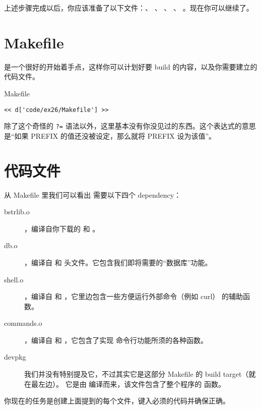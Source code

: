 上述步骤完成以后，你应该准备了以下文件：、 、
、 、 。现在你可以继续了。

\section{Makefile}

 是一个很好的开始着手点，这样你可以计划好要 build 的内容，以及你需要建立的
代码文件。

\begin{code}{Makefile}
\begin{lstlisting}
<< d['code/ex26/Makefile'] >>
\end{lstlisting}
\end{code}

除了这个奇怪的 \verb|?=| 语法以外，这里基本没有你没见过的东西。这个表达式的意思是“如果 PREFIX 
的值还没被设定，那么就将 PREFIX 设为该值”。

\section{代码文件}

从 Makefile 里我们可以看出  需要以下四个 dependency：

\begin{description}
\item[bstrlib.o]，编译自你下载的  和 。
\item[db.o]，编译自  和  头文件。它包含我们即将需要的“数据库”功能。
\item[shell.o]，编译自  和 ，它里边包含一些方便运行外部命令（例如 curl）
    的辅助函数。
\item[commands.o]，编译自  和 ，它包含了实现  
    命令行功能所须的各种函数。
\item[devpkg] 我们并没有特别提及它，不过其实它是这部分 Makefile 的 build target（就在最左边）。
    它是由  编译而来，该文件包含了整个程序的  函数。
\end{description}

你现在的任务是创建上面提到的每个文件，键入必须的代码并确保正确。

